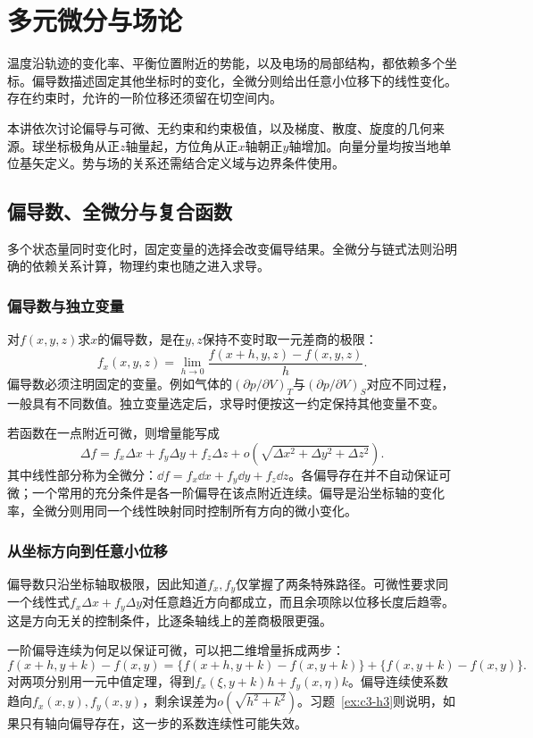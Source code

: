 \chapter{多元微分与场论}\label{ch:c3}

温度沿轨迹的变化率、平衡位置附近的势能，以及电场的局部结构，都依赖多个坐标。偏导数描述固定其他坐标时的变化，全微分则给出任意小位移下的线性变化。存在约束时，允许的一阶位移还须留在切空间内。

本讲依次讨论偏导与可微、无约束和约束极值，以及梯度、散度、旋度的几何来源。球坐标极角从正$z$轴量起，方位角从正$x$轴朝正$y$轴增加。向量分量均按当地单位基矢定义。势与场的关系还需结合定义域与边界条件使用。


\section{偏导数、全微分与复合函数}\label{sec:c3-diff}
多个状态量同时变化时，固定变量的选择会改变偏导结果。全微分与链式法则沿明确的依赖关系计算，物理约束也随之进入求导。

\subsection{偏导数与独立变量}
对$f(x,y,z)$求$x$的偏导数，是在$y,z$保持不变时取一元差商的极限：
\[f_x(x,y,z)=\lim_{h\to0}\frac{f(x+h,y,z)-f(x,y,z)}h.\]
偏导数必须注明固定的变量。例如气体的$(\partial p/\partial V)_T$与$(\partial p/\partial V)_S$对应不同过程，一般具有不同数值。独立变量选定后，求导时便按这一约定保持其他变量不变。

若函数在一点附近可微，则增量能写成
\[\Delta f=f_x\Delta x+f_y\Delta y+f_z\Delta z+o\!\left(\sqrt{\Delta x^2+\Delta y^2+\Delta z^2}\right).
\]
其中线性部分称为全微分：$\dd f=f_x\dd x+f_y\dd y+f_z\dd z$。各偏导存在并不自动保证可微；一个常用的充分条件是各一阶偏导在该点附近连续。偏导是沿坐标轴的变化率，全微分则用同一个线性映射同时控制所有方向的微小变化。

\subsection{从坐标方向到任意小位移}
偏导数只沿坐标轴取极限，因此知道$f_x,f_y$仅掌握了两条特殊路径。可微性要求同一个线性式$f_x\Delta x+f_y\Delta y$对任意趋近方向都成立，而且余项除以位移长度后趋零。这是方向无关的控制条件，比逐条轴线上的差商极限更强。

一阶偏导连续为何足以保证可微，可以把二维增量拆成两步：
\[f(x+h,y+k)-f(x,y)
=\{f(x+h,y+k)-f(x,y+k)\}+\{f(x,y+k)-f(x,y)\}.\]
对两项分别用一元中值定理，得到$f_x(\xi,y+k)h+f_y(x,\eta)k$。偏导连续使系数趋向$f_x(x,y),f_y(x,y)$，剩余误差为$o(\sqrt{h^2+k^2})$。习题~\ref{ex:c3-h3}则说明，如果只有轴向偏导存在，这一步的系数连续性可能失效。

